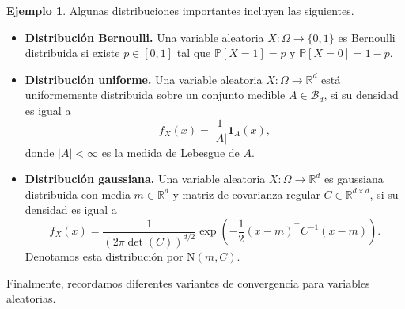 \documentclass[11pt]{report}
\theoremstyle{definition}
\newtheorem{ejemplo}[definicion]{Ejemplo}
\theoremstyle{plain}
\numberwithin{equation}{section}
\begin{document}
\begin{ejemplo}
Algunas distribuciones importantes incluyen las siguientes.
\end{ejemplo}

\begin{itemize}
    \item \textbf{Distribución Bernoulli.} Una variable aleatoria \(X:\Omega\to\{0,1\}\) es Bernoulli distribuida si existe \(p\in[0,1]\) tal que \(\mathbb{P}[X=1]=p\) y \(\mathbb{P}[X=0]=1-p\).

    \item \textbf{Distribución uniforme.} Una variable aleatoria \(X:\Omega\to\mathbb{R}^d\) está uniformemente distribuida sobre un conjunto medible \(A\in\mathcal{B}_d\), si su densidad es igual a
    \begin{equation*}
        f_X(x)=\frac{1}{|A|}\mathbf{1}_A(x),
    \end{equation*}
    donde \(|A|<\infty\) es la medida de Lebesgue de \(A\).

    \item \textbf{Distribución gaussiana.} Una variable aleatoria \(X:\Omega\to\mathbb{R}^d\) es gaussiana distribuida con media \(m\in\mathbb{R}^d\) y matriz de covarianza regular \(C\in\mathbb{R}^{d\times d}\), si su densidad es igual a
    \begin{equation*}
        f_X(x)
        =
        \frac{1}{(2\pi\det(C))^{d/2}}
        \exp\left(
            -\frac{1}{2}(x-m)^\top C^{-1}(x-m)
        \right).
    \end{equation*}
    Denotamos esta distribución por \(\mathrm{N}(m,C)\).
\end{itemize}

Finalmente, recordamos diferentes variantes de convergencia para variables aleatorias.
\end{document}
